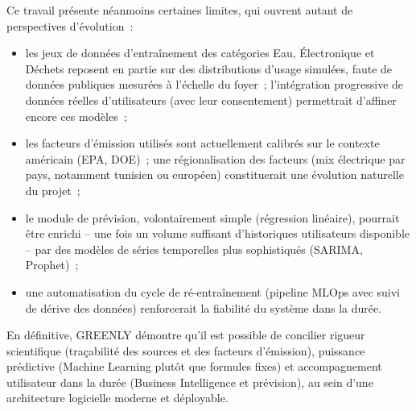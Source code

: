 Ce travail présente néanmoins certaines limites, qui ouvrent autant de perspectives d'évolution~:

\begin{itemize}[label=\textbullet,font=\normalsize]
\item les jeux de données d'entraînement des catégories Eau, Électronique et Déchets reposent en partie sur des distributions d'usage simulées, faute de données publiques mesurées à l'échelle du foyer~; l'intégration progressive de données réelles d'utilisateurs (avec leur consentement) permettrait d'affiner encore ces modèles~;
\item les facteurs d'émission utilisés sont actuellement calibrés sur le contexte américain (EPA, DOE)~; une régionalisation des facteurs (mix électrique par pays, notamment tunisien ou européen) constituerait une évolution naturelle du projet~;
\item le module de prévision, volontairement simple (régression linéaire), pourrait être enrichi -- une fois un volume suffisant d'historiques utilisateurs disponible -- par des modèles de séries temporelles plus sophistiqués (SARIMA, Prophet)~;
\item une automatisation du cycle de ré-entraînement (pipeline MLOps avec suivi de dérive des données) renforcerait la fiabilité du système dans la durée.
\end{itemize}

En définitive, GREENLY démontre qu'il est possible de concilier rigueur scientifique (traçabilité des sources et des facteurs d'émission), puissance prédictive (Machine Learning plutôt que formules fixes) et accompagnement utilisateur dans la durée (Business Intelligence et prévision), au sein d'une architecture logicielle moderne et déployable.
